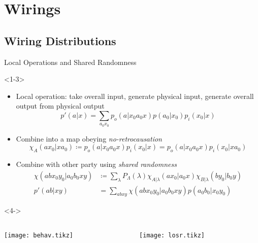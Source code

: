 \documentclass[xcolor=dvipsnames]{beamer}
\newcommand{\?}{\mathrel{?}} %
\begin{document}
\section{Wirings}

\subsection{Wiring Distributions}

\begin{frame}{Local Operations and Shared Randomness\setcounter{footnote}{0}}
  \begin{onlyenv}<1-3>
    \begin{itemize}[<+->]
      \item Local operation: take overall input, generate physical input, generate overall output from physical output
        \[ p'(a|x) = \sum_{a_0 x_0} p_o(a|x_0 a_0 x) p(a_0|x_0) p_i(x_0|x) \]
      \item Combine into a map obeying \emph{no-retrocausation}
        \[ \chi_A(a x_0 | x a_0) \coloneqq p_o(a|x_0a_0x) p_i(x_0|x) = p_o(a|x_0a_0x) p_i(x_0|x a_0) \]
      \item Combine with other party using \emph{shared randomness}
        \begin{align*}
          \chi(abx_0y_0|a_0b_0xy) &\coloneqq \sum_{\lambda} P_{\Lambda}(\lambda) \chi_{A|\lambda}(ax_0|a_0x) \chi_{B|\lambda}(by_0|b_0y) \\
          p'(ab|xy) &= \sum_{abxy} \chi(abx_0y_0|a_0b_0xy) p(a_0b_0|x_0y_0)
        \end{align*}
    \end{itemize}
  \end{onlyenv}
  \begin{onlyenv}<4->
    \begin{columns}
      \begin{column}[c]{0.3\linewidth}
        \centering
        \texttt{[image: behav.tikz]}
      \end{column}
      \begin{column}[c]{0.7\linewidth}
        \centering
        \texttt{[image: losr.tikz]}
      \end{column}
    \end{columns}
  \end{onlyenv}
\end{frame}
\end{document}
